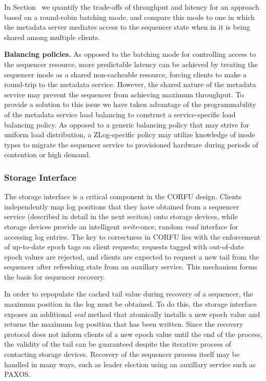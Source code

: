 \documentclass[10pt,twocolumn]{article}
\begin{document}
In Section~\cite{evaluation} we quantify the trade-offs of throughput and
latency for an approach based on a round-robin batching mode, and compare this
mode to one in which the metadata server mediates access to the sequencer
state when in it is being shared among multiple clients.

{\bf Balancing policies.}
As opposed to the batching mode for controlling access to the sequencer
resource, more predictable latency can be achieved by treating the sequencer
inode as a shared non-cacheable resource, forcing clients to make a round-trip
to the metadata service. However, the shared nature of the metadata service
may prevent the sequencer from achieving maximum throughput. To provide a
solution to this issue we have taken advantage of the programmability of the
metadata service load balancing to construct a service-specific load balancing
policy. As opposed to a generic balancing policy that may strive for uniform
load distribution, a ZLog-specific policy may utilize knowledge of inode types
to migrate the sequencer service to provisioned hardware during periods of
contention or high demand.

\subsubsection{Storage Interface}

The storage interface is a critical component in the CORFU design. Clients
independently map log positions that they have obtained from a sequencer
service (described in detail in the next seciton) onto storage devices, while
storage devices provide an intelligent \emph{write}-once, random \emph{read}
interface for accessing log entries. The key to correctness in CORFU lies with
the enforcement of up-to-date epoch tags on client requests; requests tagged
with out-of-date epoch values are rejected, and clients are expected to
request a new tail from the sequencer after refreshing state from an auxillary
service.  This mechanism forms the basis for sequencer recovery.

In order to repopulate the cached tail value during recovery of a sequencer,
the maximum position in the log must be obtained. To do this, the storage
interface exposes an additional \emph{seal} method that atomically installs a
new epoch value and returns the maximum log position that has been written.
Since the recovery protocol does not inform clients of a new epoch value until
the end of the process, the validity of the tail can be guaranteed despite the
iterative process of contacting storage devices.  Recovery of the sequencer
process itself may be handled in many ways, such as leader election using an
auxillary service such as PAXOS.
\end{document}
